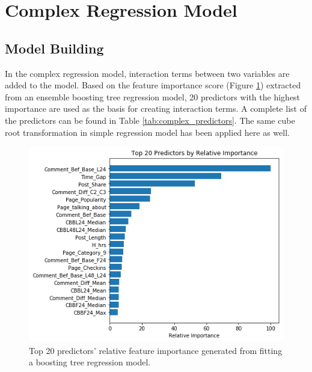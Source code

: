 \documentclass[]{article}
\begin{document}
%




\section{Complex Regression Model}
\subsection{Model Building}
In the complex regression model, interaction terms between two variables are added to the model. Based on the feature importance score (Figure \ref{fig:feature_imp}) extracted from an ensemble boosting tree regression model, 20 predictors with the highest importance are used as the basis for creating interaction terms. A complete list of the predictors can be found in Table \ref{tab:complex_predictors}. The same cube root transformation in simple regression model has been applied here as well. 
%
\begin{figure}[hbtp]
	\centering
	\includegraphics[width=.7\columnwidth]{../Figures/feature_importance}
	\caption{Top 20 predictors' relative feature importance generated from fitting a boosting tree regression model.}
	\label{fig:feature_imp}
\end{figure}
%
%
\end{document}
